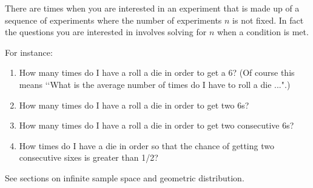 There are times when you are interested in an
experiment that is made up of a sequence of
experiments where the number of experiments $n$ is not fixed.
In fact the questions you are interested in involves
solving for $n$ when a condition is met.

For instance:
\begin{enumerate}
\item
  How many times do I have a roll a die in order to get a 6?
  (Of course this means \lq\lq What is the average number of times do I have
  to roll a die ...".)
\item
  How many times do I have a roll a die in order to get two 6s?
\item
  How many times do I have a roll a die in order to get two consecutive 6s?
\item
  How times do I have a die in order
  so that the chance of 
  getting two consecutive sixes is greater than 1/2?
\end{enumerate}

See sections on infinite sample space and geometric distribution. 
